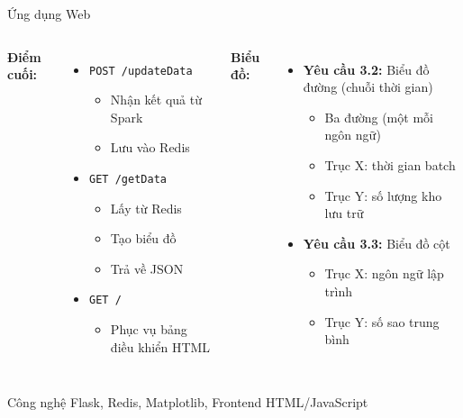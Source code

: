 \documentclass[aspectratio=169]{beamer}
\begin{document}
\begin{frame}{Ứng dụng Web}
    \begin{columns}
        \textbf{Điểm cuối:}
        \begin{itemize}
            \item \texttt{POST /updateData}
            \begin{itemize}
                \item Nhận kết quả từ Spark
                \item Lưu vào Redis
            \end{itemize}
            \item \texttt{GET /getData}
            \begin{itemize}
                \item Lấy từ Redis
                \item Tạo biểu đồ
                \item Trả về JSON
            \end{itemize}
            \item \texttt{GET /}
            \begin{itemize}
                \item Phục vụ bảng điều khiển HTML
            \end{itemize}
        \end{itemize}
        
        \textbf{Biểu đồ:}
        \begin{itemize}
            \item \textbf{Yêu cầu 3.2:} Biểu đồ đường (chuỗi thời gian)
            \begin{itemize}
                \item Ba đường (một mỗi ngôn ngữ)
                \item Trục X: thời gian batch
                \item Trục Y: số lượng kho lưu trữ
            \end{itemize}
            \item \textbf{Yêu cầu 3.3:} Biểu đồ cột
            \begin{itemize}
                \item Trục X: ngôn ngữ lập trình
                \item Trục Y: số sao trung bình
            \end{itemize}
        \end{itemize}
    \end{columns}
    
    \vspace{0.3cm}
    \begin{block}{Công nghệ}
        Flask, Redis, Matplotlib, Frontend HTML/JavaScript
    \end{block}
\end{frame}
\end{document}
